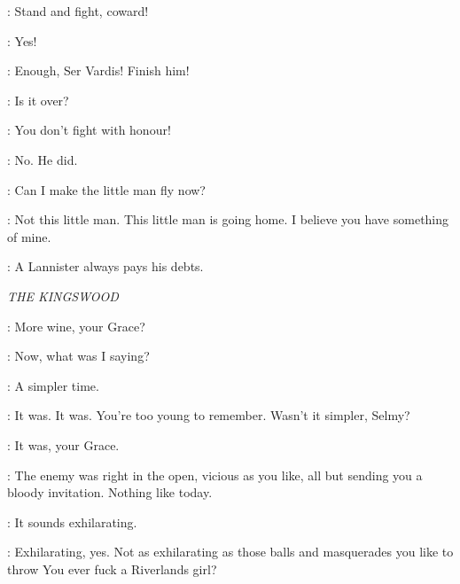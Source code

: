 \LYSA: Stand and fight, coward! 


\TYRION: Yes! 

\LYSA: Enough, Ser Vardis! Finish him! 


\ROBYN:  Is it over? 

\LYSA: You don't fight with honour!

\BRONN: No.  He did.


\ROBYN: Can I make the little man fly now?

\TYRION: Not this little man. This little man is going home.  I believe you have something of mine.


\TYRION: A Lannister always pays his debts. 


\scene

\textit{THE KINGSWOOD} 


\LANCEL: More wine, your Grace? 

\ROBERT: Now, what was I saying? 

\RENLY: A simpler time. 

\ROBERT: It was. It was. You're too young to remember. Wasn't it simpler, Selmy? 

\SELMY: It was, your Grace. 

\ROBERT: The enemy was right in the open, vicious as you like, all but sending you a bloody invitation. Nothing like today. 

\RENLY: It sounds exhilarating. 

\ROBERT: Exhilarating, yes. Not as exhilarating as those balls and masquerades you like to throw  You ever fuck a Riverlands girl? 

